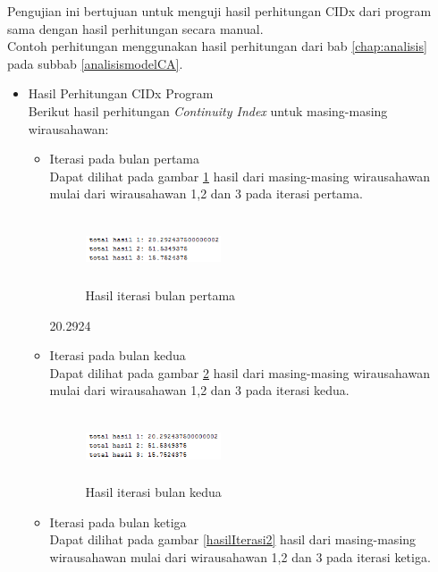 Pengujian ini bertujuan untuk menguji hasil perhitungan CIDx dari program sama dengan hasil perhitungan secara manual.\\
Contoh perhitungan menggunakan hasil perhitungan dari bab \ref{chap:analisis} pada subbab \ref{analisismodelCA}.
\begin{itemize}
\item Hasil Perhitungan CIDx Program\\
	Berikut hasil perhitungan \textit{Continuity Index} untuk masing-masing wirausahawan:
	\begin{itemize}
		\item Iterasi pada bulan pertama\\
		Dapat dilihat pada gambar \ref{hasilIterasi0} hasil dari masing-masing wirausahawan mulai dari wirausahawan 1,2 dan 3 pada iterasi pertama.
	\begin{figure} [H]
	\centering  
	\includegraphics[width=4cm, height=2cm]{hasilIterasi0} 
		\caption[Hasil Iterasi bulan pertama]{Hasil iterasi bulan pertama}
	\label{hasilIterasi0} 
\end{figure}
	 20.2924
		\item Iterasi pada bulan kedua\\
		Dapat dilihat pada gambar \ref{hasilIterasi1} hasil dari masing-masing wirausahawan mulai dari wirausahawan 1,2 dan 3 pada iterasi kedua.
	\begin{figure} [H]
	\centering  
	\includegraphics[width=4cm, height=2cm]{hasilIterasi1} 
		\caption[Hasil Iterasi bulan kedua]{Hasil iterasi bulan kedua}
	\label{hasilIterasi1} 
\end{figure}
		\item Iterasi pada bulan ketiga\\
		Dapat dilihat pada gambar \ref{hasilIterasi2} hasil dari masing-masing wirausahawan mulai dari wirausahawan 1,2 dan 3 pada iterasi ketiga.
		

\end{itemize}
\end{itemize}

